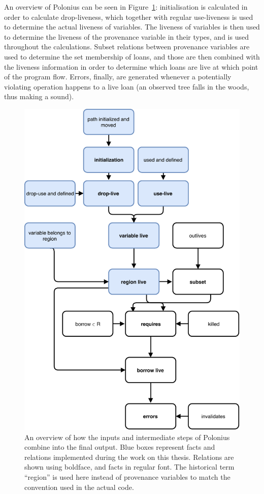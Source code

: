 \documentclass[11pt,a4paper,twoside,openany,draft]{report}
\begin{document}
An overview of Polonius can be seen in Figure~\ref{fig:polonius-overview}:
initialisation is calculated in order to calculate drop-liveness, which together
with regular use-liveness is used to determine the actual liveness of variables.
The liveness of variables is then used to determine the liveness of the
provenance variable in their types, and is used throughout the calculations.
Subset relations between provenance variables are used to determine the set
membership of loans, and those are then combined with the liveness information
in order to determine which loans are live at which point of the program flow.
Errors, finally, are generated whenever a potentially violating operation
happens to a live loan (an observed tree falls in the woods, thus making a
sound).

\begin{figure}
  \includegraphics[width=0.9\linewidth]{Graphs/polonius-overview}
  \caption[Flowchart of the Polonius Inputs and Outputs]{An overview of how the
    inputs and intermediate steps of Polonius combine into the final output.
    Blue boxes represent facts and relations implemented during the work on this
    thesis. Relations are shown using boldface, and facts in regular font. The
    historical term ``region'' is used here instead of provenance variables to
    match the convention used in the actual code.}\label{fig:polonius-overview}
\end{figure}
\end{document}
